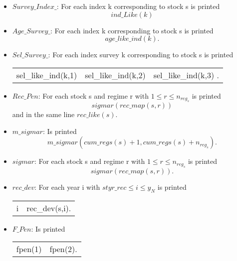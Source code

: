 \documentclass{article}
\begin{document}
\begin{itemize}
\item $Survey\_Index\_$: For each index k corresponding to stock s is printed
\begin{equation}
    ind\_Like(k)
\end{equation}

\item $Age\_Survey\_$: For each index k corresponding to stock s is printed
\begin{equation}
    age\_like\_ind(k).
\end{equation}

\item $Sel\_Survey\_$: For each index survey k corresponding to stock s is printed
\begin{center}
    \begin{tabular}{c c c }
        sel\_like\_ind(k,1) & sel\_like\_ind(k,2) & sel\_like\_ind(k,3) . \\
         \end{tabular}
\end{center}

\item $Rec\_Pen$: For each stock s and regime r with $1\leq r \leq n_{reg_s}$ is printed
\begin{equation}
    sigmar(rec\_map(s,r))
\end{equation}
and in the same line $rec\_like(s)$.
     
\item $m\_sigmar$: Is printed
\begin{equation}
m\_sigmar(cum\_regs(s)+1,cum\_regs(s)+n_{reg_s}).
\end{equation}

\item $sigmar$: For each stock s and regime r with $1\leq r \leq n_{reg_s}$ is printed
\begin{equation}
    sigmar(rec\_map(s,r)).
\end{equation}

 \item $rec\_dev$: For each year i with $styr\_rec \leq i \leq y_N$ is printed
 \begin{center}
     \begin{tabular}{c c}
         i & rec\_dev(s,i). \\
          
     \end{tabular}
 \end{center}

\item $F\_Pen$: Is printed 
\begin{center}
\begin{tabular}{c c}
    fpen(1) & fpen(2). \\
     

\end{tabular}
\end{center}
\end{itemize}
\end{document}
